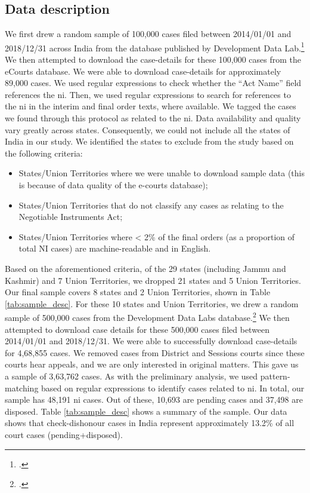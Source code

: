 \subsection{Data description}
\label{sec:data-description}
We first drew a random sample of 100,000 cases filed between 2014/01/01 and 2018/12/31 across India from the database published by Development Data Lab.\footcite{devdatalabs2021_eCourtsData} We then attempted to download the case-details for these 100,000 cases from the eCourts database. We were able to download case-details for approximately 89,000 cases. We used regular expressions to check whether the ``Act Name'' field references the \gls{ni}. Then, we used regular expressions to search for references to the \gls{ni} in the interim and final order texts, where available. We tagged the cases we found through this protocol as related to the \gls{ni}. Data availability and quality vary greatly across states. Consequently, we could not include all the states of India in our study. We identified the states to exclude from the study based on the following criteria:

\begin{itemize}
\item States/Union Territories where we were unable to download sample data (this is because of data quality of the e-courts database);
\item States/Union Territories that do not classify any cases as relating to the Negotiable Instruments Act;
\item States/Union Territories where < 2\% of the final orders (as a proportion of total NI cases) are machine-readable and in English.
\end{itemize}

Based on the aforementioned criteria, of the 29 states (including Jammu and Kashmir) and 7 Union Territories, we dropped 21 states and 5 Union Territories. Our final sample covers 8 states and 2 Union Territories, shown in Table \ref{tab:sample_desc}. For these 10 states and Union Territories, we drew a random sample of 500,000 cases from the Development Data Labs database.\footcite{devdatalabs2021_eCourtsData} We then attempted to download case details for these 500,000 cases filed between 2014/01/01 and 2018/12/31. We were able to successfully download case-details for 4,68,855 cases. We removed cases from District and Sessions courts since these courts hear appeals, and we are only interested in original matters. This gave us a sample of 3,63,762 cases. As with the preliminary analysis, we used pattern-matching based on regular expressions to identify cases related to \gls{ni}. In total, our sample has 48,191 \gls{ni} cases. Out of these, 10,693 are pending cases and 37,498 are disposed. Table \ref{tab:sample_desc} shows a summary of the sample. Our data shows that check-dishonour cases in India represent approximately 13.2\% of all court cases (pending+disposed).

